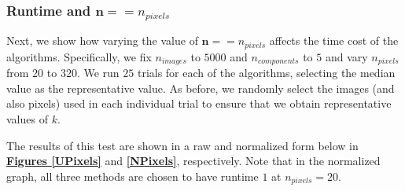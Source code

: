 \documentclass[12pt]{article}
\begin{document}
\subsubsection{Runtime and $\textbf{n} == n_{pixels}$}\label{5.1.3}

Next, we show how varying the value of $\textbf{n} == n_{pixels}$ affects the time cost of the algorithms. Specifically, we fix $n_{images}$ to $5000$ and $n_{components}$ to $5$ and vary $n_{pixels}$ from $20$ to $320$. We run $25$ trials for each of the algorithms, selecting the median value as the representative value. As before, we randomly select the images (and also pixels) used in each individual trial to ensure that we obtain representative values of $k$. 

The results of this test are shown in a raw and normalized form below in \textbf{\hyperref[UPixels]{Figures \ref*{UPixels}}} and \textbf{\hyperref[NPixels]{\ref*{NPixels}}}, respectively. Note that in the normalized graph, all three methods are chosen to have runtime $1$ at $n_{pixels} = 20$.
\end{document}
